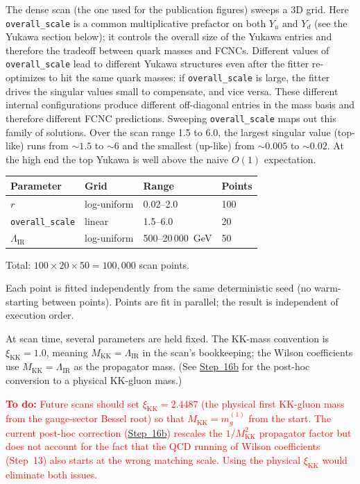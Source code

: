 \documentclass[11pt]{article}
\newcommand{\Mkk}{M_{\mathrm{KK}}}
\newcommand{\LamIR}{\Lambda_{\mathrm{IR}}}
\begin{document}
The dense scan (the one used for the publication figures) sweeps a 3D grid.
Here \texttt{overall\_scale} is a common multiplicative prefactor on both $Y_u$
and $Y_d$ (see the Yukawa section below); it controls the overall size of the
Yukawa entries and therefore the tradeoff between quark masses and FCNCs.
Different values of \texttt{overall\_scale} lead to different Yukawa structures
even after the fitter re-optimizes to hit the same quark masses: if
\texttt{overall\_scale} is large, the fitter drives the singular values small to
compensate, and vice versa. These different internal configurations produce
different off-diagonal entries in the mass basis and therefore different FCNC
predictions. Sweeping \texttt{overall\_scale} maps out this family of
solutions. Over the scan range 1.5 to 6.0, the largest singular value
(top-like) runs from $\sim 1.5$ to $\sim 6$ and the smallest (up-like) from
$\sim 0.005$ to $\sim 0.02$. At the high end the top Yukawa is well above the
naive $O(1)$ expectation.

\begin{table}[h]
\centering
\begin{tabular}{@{}llll@{}}
\toprule
Parameter & Grid & Range & Points \\
\midrule
$r$ & log-uniform & 0.02--2.0 & 100 \\
\texttt{overall\_scale} & linear & 1.5--6.0 & 20 \\
$\LamIR$ & log-uniform & 500--20\,000~GeV & 50 \\
\bottomrule
\end{tabular}
\end{table}

Total: $100 \times 20 \times 50 = 100{,}000$ scan points.

Each point is fitted independently from the same deterministic seed (no
warm-starting between points).  Points are fit in parallel; the result is
independent of execution order.

At scan time, several parameters are held fixed. The KK-mass convention is
$\xi_{\mathrm{KK}} = 1.0$, meaning $\Mkk = \LamIR$ in the scan's bookkeeping;
the Wilson coefficients use $\Mkk = \LamIR$ as the propagator mass. (See
\hyperref[sec:step16b]{Step~16b} for the post-hoc conversion to a physical
KK-gluon mass.)

\textcolor{red}{\textbf{To do:} Future scans should set
$\xi_{\mathrm{KK}} = 2.4487$ (the physical first KK-gluon mass from the
gauge-sector Bessel root) so that $\Mkk = m_g^{(1)}$ from the start.  The
current post-hoc correction (\hyperref[sec:step16b]{Step~16b}) rescales
the $1/\Mkk^2$ propagator factor but does not account for the fact that
the QCD running of Wilson coefficients (Step~13) also starts at the wrong
matching scale.  Using the physical $\xi_{\mathrm{KK}}$ would eliminate
both issues.}
\end{document}
